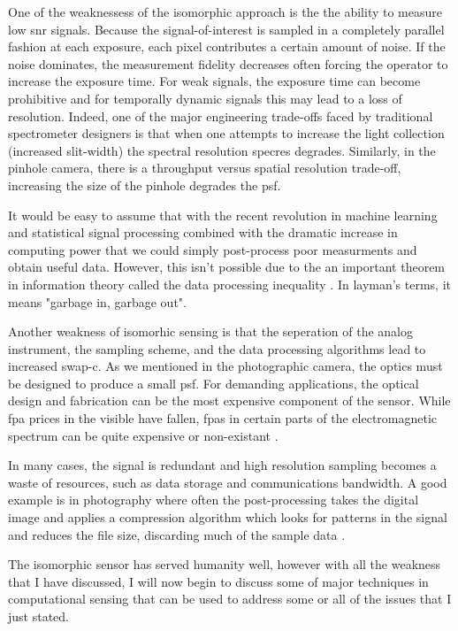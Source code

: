 One of the weaknessess of the isomorphic approach is the the ability to measure low \gls{snr} signals. Because the signal-of-interest is sampled in a completely parallel fashion at each exposure, each pixel contributes a certain amount of noise. If the noise dominates, the measurement fidelity decreases often forcing the operator to increase the exposure time. For weak signals, the exposure time can become prohibitive and for temporally dynamic signals this may lead to a loss of resolution. Indeed, one of the major engineering trade-offs faced by traditional spectrometer designers is that when one attempts to increase the light collection (increased slit-width) the spectral resolution \gls{specres} degrades. Similarly, in the pinhole camera, there is a throughput versus spatial resolution trade-off, increasing the size of the pinhole degrades the \gls{psf}.

It would be easy to assume that with the recent revolution in machine learning and statistical signal processing combined with the dramatic increase in computing power that we could simply post-process poor measurments and obtain useful data. However, this isn't possible due to the an important theorem in information theory called the \gls{data processing inequality} \cite{cover2012elements}. In layman's terms, it means "garbage in, garbage out".

Another weakness of isomorhic sensing is that the seperation of the analog instrument, the sampling scheme, and the data processing algorithms lead to increased \gls{swap-c}. As we mentioned in the photographic camera, the optics must be designed to produce a small \gls{psf}. For demanding applications, the optical design and fabrication can be the most expensive component of the sensor. While \gls{fpa} prices in the visible have fallen, \glspl{fpa} in certain parts of the electromagnetic spectrum can be quite expensive or non-existant \cite{watts2014terahertz, noor2011compressive}.

In many cases, the signal is redundant and high resolution sampling becomes a waste of resources, such as data storage and communications bandwidth. A good example is in photography where often the post-processing takes the digital image and applies a compression algorithm which looks for patterns in the signal and reduces the file size, discarding much of the sample data \cite{taubman2012jpeg2000}. 

The isomorphic sensor has served humanity well, however with all the weakness that I have discussed, I will now begin to discuss some of major techniques in computational sensing that can be used to address some or all of the issues that I just stated. 

